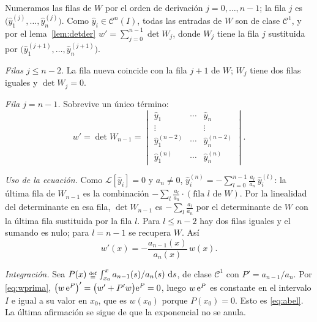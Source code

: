 \documentclass[11pt,twoside]{article}
\newcommand\Lop{\mathcal L}
\newcommand\yh{\hat y}
\newcommand\Cl{\mathcal C}
\begin{document}
\begin{demostracion}
Numeramos las filas de $W$ por el orden de derivación $j=0,\dots,n-1$; la fila $j$ es $\big(\yh_1^{(j)},\dots,\yh_n^{(j)}\big)$.
Como $\yh_i\in\Cl^n(I)$, todas las entradas de $W$ son de clase $\Cl^1$, y por el lema~\ref{lem:detder}
$w'=\sum_{j=0}^{n-1}\det W_j$, donde $W_j$ tiene la fila $j$ sustituida por $\big(\yh_1^{(j+1)},\dots,\yh_n^{(j+1)}\big)$.
\begin{pasos}
\item \emph{Filas $j\le n-2$.} La fila nueva coincide con la fila $j+1$ de $W$; $W_j$ tiene dos filas iguales y $\det W_j=0$.
\item \emph{Fila $j=n-1$.} Sobrevive un único término:
\begin{equation*}
w'=\det W_{n-1}=\begin{vmatrix}\yh_1&\cdots&\yh_n\\ \vdots&&\vdots\\ \yh_1^{(n-2)}&\cdots&\yh_n^{(n-2)}\\ \yh_1^{(n)}&\cdots&\yh_n^{(n)}\end{vmatrix}.
\end{equation*}
\item \emph{Uso de la ecuación.} Como $\Lop[\yh_i]=0$ y $a_n\neq0$, $\yh_i^{(n)}=-\sum_{l=0}^{n-1}\frac{a_l}{a_n}\,\yh_i^{(l)}$: la
última fila de $W_{n-1}$ es la combinación $-\sum_l\frac{a_l}{a_n}\cdot(\text{fila }l\text{ de }W)$. Por la linealidad del
determinante en esa fila, $\det W_{n-1}$ es $-\sum_l\frac{a_l}{a_n}$ por el determinante de $W$ con la última fila sustituida
por la fila $l$. Para $l\le n-2$ hay dos filas iguales y el sumando es nulo; para $l=n-1$ se recupera $W$. Así
\begin{equation}\label{eq:wprima}
w'(x)=-\frac{a_{n-1}(x)}{a_n(x)}\,w(x).
\end{equation}
\item \emph{Integración.} Sea $P(x)\defeq\int_{x_0}^{x}a_{n-1}(s)/a_n(s)\,\dd s$, de clase $\Cl^1$ con $P'=a_{n-1}/a_n$. Por
\eqref{eq:wprima}, $\big(w\,\mathrm{e}^{P}\big)'=\big(w'+P'w\big)\mathrm{e}^{P}=0$, luego $w\,\mathrm{e}^{P}$ es constante en el intervalo $I$ e igual
a su valor en $x_0$, que es $w(x_0)$ porque $P(x_0)=0$. Esto es \eqref{eq:abel}. La última afirmación se sigue de que la
exponencial no se anula.
\end{pasos}
\end{demostracion}
\end{document}
